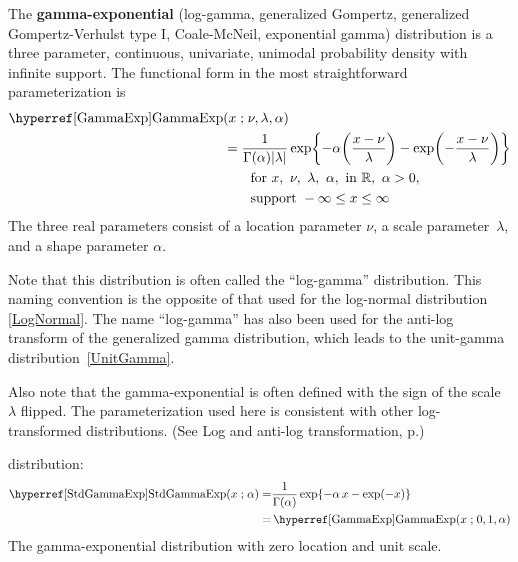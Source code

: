 

\label{sec:GammaExp}
{} 

The {\bf gamma-exponential} (log-gamma, generalized Gompertz, generalized Gompertz-Verhulst type I, Coale-McNeil, exponential gamma) distribution \cite{Bartlett1946,Prentice1974,Johnson1995,Gonzalez2013} is  a three parameter, continuous, univariate, unimodal probability density with infinite support. The functional form in the most straightforward parameterization is
\begin{align}
\label{GammaExp}
\opr{GammaExp}&(x\given \nu, \lambda, \alpha) 
\\ \notag &=
\frac{1}{ \Gamma(\alpha) |\lambda|}  \exp\Left\{- \alpha \Left(\frac{x-\nu}{\lambda}\Right) - \exp\Left(- \frac{x-\nu}{\lambda}\Right)  \Right\} \checked 
\\ \notag
& \qquad \text{for } x,\ \nu,\ \lambda,\ \alpha,\   \text{in } \mathbb{R}, 
\ \alpha>0, \ 
\\ \notag
& \qquad \text{support } -\infty \leq x \leq \infty
\notag
\end{align}
The three real parameters consist of a location parameter $\nu$, a scale parameter~$\lambda$, and a shape parameter $\alpha$. 

Note that this distribution is often called the ``log-gamma'' distribution. This naming convention is the opposite of that used for the log-normal distribution \eqref{LogNormal}. The name  ``log-gamma''  has also been used for the anti-log transform of the generalized gamma distribution, which leads to the unit-gamma distribution~\eqref{UnitGamma}.%

Also note that the gamma-exponential is often defined with the sign of the scale $\lambda$ flipped. The parameterization used here is consistent with other log-transformed distributions. (See Log and anti-log transformation, p.\pageref{logtransform}) 





 distribution:
\begin{align}
\label{StdGammaExp}
\opr{StdGammaExp}(x\given  \alpha) 
=&
\frac{1}{\Gamma(\alpha) }  \exp\Left\{- \alpha\, x - \exp (-x)  \Right\}  \checked
\\ \notag =& \opr{GammaExp}(x\given 0,1,\alpha) \checked
\end{align} 
The gamma-exponential distribution with zero location and unit scale.

